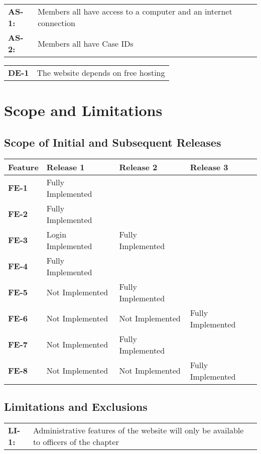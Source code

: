 \documentclass[11pt,letterpaper,rotate]{article}
\begin{document}
\begin{longtable}{lp{12cm}}
{\bf AS-1:} & Members all have access to a computer and an internet
connection\\
{\bf AS-2:} & Members all have Case IDs\\
\end{longtable}

\begin{longtable}{lp{12cm}}
{\bf DE-1} & The website depends on free hosting
\end{longtable}

\section{Scope and Limitations}

\subsection{Scope of Initial and Subsequent Releases}

\begin{longtable}{|l|p{4cm}|p{4cm}|p{4cm}|}
\hline
{\bf Feature} & {\bf Release 1} & {\bf Release 2} & {\bf Release 3} \\
\hline
{\bf FE-1} & Fully Implemented & ~ & ~ \\ \hline
{\bf FE-2} & Fully Implemented & ~ & ~ \\ \hline
{\bf FE-3} & Login Implemented & Fully Implemented & ~ \\ \hline
{\bf FE-4} & Fully Implemented & ~ & ~ \\ \hline
{\bf FE-5} & Not Implemented & Fully Implemented & ~ \\ \hline
{\bf FE-6} & Not Implemented & Not Implemented & Fully Implemented \\
\hline
{\bf FE-7} & Not Implemented & Fully Implemented & ~ \\ \hline
{\bf FE-8} & Not Implemented & Not Implemented & Fully Implemented \\ \hline
\end{longtable}

\subsection{Limitations and Exclusions}

\begin{longtable}{lp{12cm}}
{\bf LI-1:} & Administrative features of the website will only be
available to officers of the chapter\\
\end{longtable}
\end{document}
